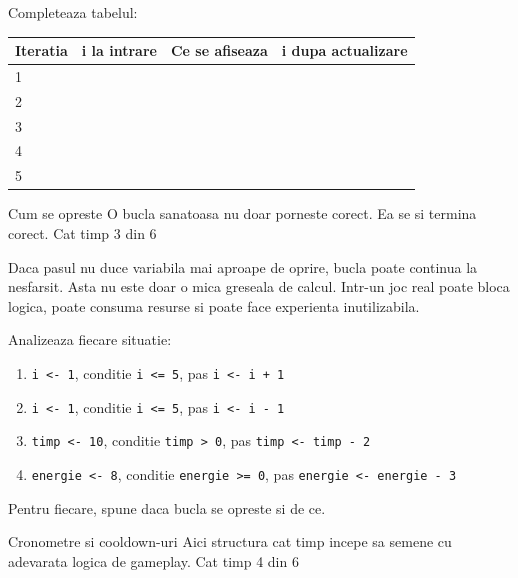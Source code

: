 \begin{guidebox}
Completeaza tabelul:
\begin{center}
\begin{tabular}{llll}
\toprule
Iteratia & i la intrare & Ce se afiseaza & i dupa actualizare \\
\midrule
1 & & & \\
2 & & & \\
3 & & & \\
4 & & & \\
5 & & & \\
\bottomrule
\end{tabular}
\end{center}
\end{guidebox}

\clearpage

\PageHeader
  {Cum se opreste}
  {O bucla sanatoasa nu doar porneste corect. Ea se si termina corect.}
  {Cat timp 3 din 6}

\begin{conceptbox}
Daca pasul nu duce variabila mai aproape de oprire, bucla poate continua la nesfarsit. Asta nu este doar o mica greseala de calcul. Intr-un joc real poate bloca logica, poate consuma resurse si poate face experienta inutilizabila.
\end{conceptbox}

\begin{semibox}
Analizeaza fiecare situatie:
\begin{enumerate}
\item \texttt{i <- 1}, conditie \texttt{i <= 5}, pas \texttt{i <- i + 1}
\item \texttt{i <- 1}, conditie \texttt{i <= 5}, pas \texttt{i <- i - 1}
\item \texttt{timp <- 10}, conditie \texttt{timp > 0}, pas \texttt{timp <- timp - 2}
\item \texttt{energie <- 8}, conditie \texttt{energie >= 0}, pas \texttt{energie <- energie - 3}
\end{enumerate}
Pentru fiecare, spune daca bucla se opreste si de ce.
\end{semibox}

\clearpage

\PageHeader
  {Cronometre si cooldown-uri}
  {Aici structura cat timp incepe sa semene cu adevarata logica de gameplay.}
  {Cat timp 4 din 6}


